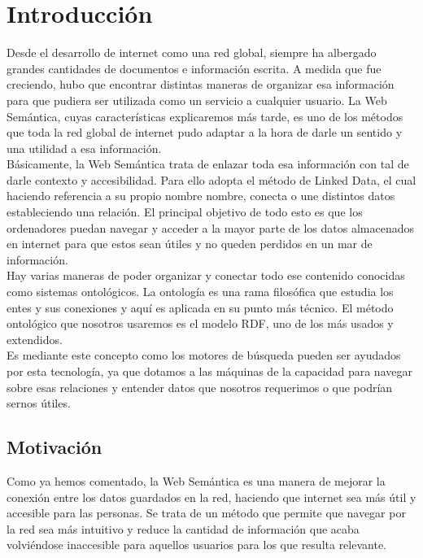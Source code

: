 \chapter{Introducción}
\label{cap:introduccion}

Desde el desarrollo de internet como una red global, siempre ha albergado grandes cantidades de documentos e información escrita. A medida que fue creciendo, hubo que encontrar distintas maneras de organizar esa información para que pudiera ser utilizada como un servicio a cualquier usuario. La Web Semántica, cuyas características explicaremos más tarde, es uno de los métodos que toda la red global de internet pudo adaptar a la hora de darle un sentido y una utilidad a esa información.\\

Básicamente, la Web Semántica trata de enlazar toda esa información con tal de darle contexto y accesibilidad. Para ello adopta el método de Linked Data, el cual haciendo referencia a su propio nombre nombre, conecta o une distintos datos estableciendo una relación. El principal objetivo de todo esto es que los ordenadores puedan navegar y acceder a la mayor parte de los datos almacenados en internet para que estos sean útiles y no queden perdidos en un mar de información.\\

Hay varias maneras de poder organizar y conectar todo ese contenido conocidas como sistemas ontológicos. La ontología es una rama filosófica que estudia los entes y sus conexiones y aquí es aplicada en su punto más técnico. El método ontológico que nosotros usaremos es el modelo RDF, uno de los más usados y extendidos.\\

Es mediante este concepto como los motores de búsqueda pueden ser ayudados por esta tecnología, ya que dotamos a las máquinas de la capacidad para navegar sobre esas relaciones y entender datos que nosotros requerimos o que podrían sernos útiles.\\

\section{Motivación}

Como ya hemos comentado, la Web Semántica es una manera de mejorar la conexión entre los datos guardados en la red, haciendo que internet sea más útil y accesible para las personas. Se trata de un método que permite que navegar por la red sea más intuitivo y reduce la cantidad de información que acaba volviéndose inaccesible para aquellos usuarios para los que resulta relevante.\\

